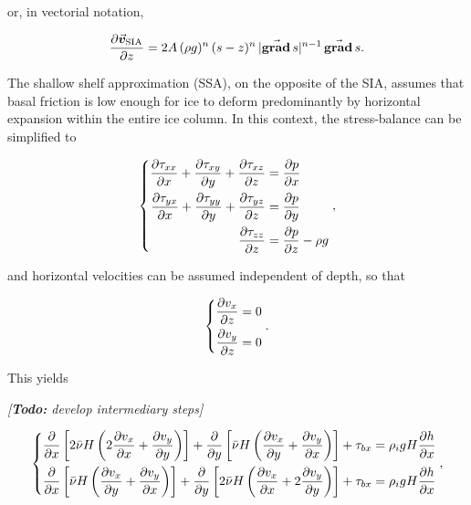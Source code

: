 \documentclass{article}
\newcommand{\todo}[1]{\emph{[\textbf{Todo:} #1]}}
\newcommand{\vect}[1]{\va*{#1}} %
\renewcommand{\grad}[1]{\vect{\mathrm{grad}}\,#1}   %
\newcommand{\vv}[0]{\vect{v}}           %
\newcommand{\vsia}[0]{\vv_{\mathrm{SIA}}}   %
\begin{document}
or, in vectorial notation,

\begin{equation}
    \pdv{\vsia}{z} = 2A\,(\rho g)^n\,(s-z)^n\,|\grad{s}|^{n-1}\,\grad{s}.
\end{equation}

The shallow shelf approximation (SSA), on the opposite of the SIA, assumes that
basal friction is low enough for ice to deform predominantly by horizontal
expansion within the entire ice column. In this context, the stress-balance can
be simplified to

\begin{equation}
    \label{eqn:ssa}
    \left\{\begin{aligned}
        \pdv{\tau_{xx}}{x} + \pdv{\tau_{xy}}{y} + \pdv{\tau_{xz}}{z}
            &= \pdv{p}{x} \\
        \pdv{\tau_{yx}}{x} + \pdv{\tau_{yy}}{y} + \pdv{\tau_{yz}}{z}
            &= \pdv{p}{y} \\
        \pdv{\tau_{zz}}{z} &= \pdv{p}{z} - \rho g
    \end{aligned}\right.,
\end{equation}

and horizontal velocities can be assumed independent of depth, so that

\begin{equation}
    \left\{\begin{aligned}
        \pdv{v_x}{z} &= 0 \\
        \pdv{v_y}{z} &= 0 \\
    \end{aligned}\right..
\end{equation}

This yields

\todo{develop intermediary steps}

\begin{equation}
    \left\{\begin{aligned}
        \pdv{x} \left[2\bar{\nu}H
                      \left(2\pdv{v_x}{x} + \pdv{v_y}{y}\right) \right]
            + \pdv{y} \left[\bar{\nu}H
                            \left(\pdv{v_x}{y} + \pdv{v_y}{x}\right) \right]
            + \tau_{bx} &= \rho_i gH \pdv{h}{x} \\
        \pdv{x} \left[\bar{\nu}H
                      \left(\pdv{v_x}{y} + \pdv{v_y}{x}\right) \right]
            + \pdv{y} \left[2\bar{\nu}H
                            \left(\pdv{v_x}{x} + 2\pdv{v_y}{y}\right) \right]
            + \tau_{bx} &= \rho_i gH \pdv{h}{x} \\
    \end{aligned}\right.,
\end{equation}
\end{document}
